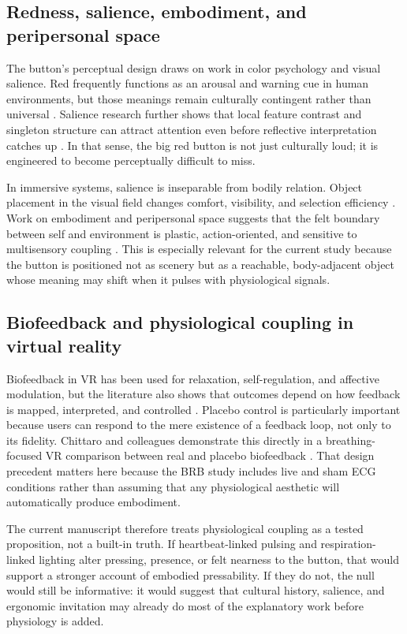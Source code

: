 \subsection{Redness, salience, embodiment, and peripersonal space}

The button's perceptual design draws on work in color psychology and visual salience. Red frequently functions as an arousal and warning cue in human environments, but those meanings remain culturally contingent rather than universal \citep{ElliotMaier2014,GaoEtAl2007}. Salience research further shows that local feature contrast and singleton structure can attract attention even before reflective interpretation catches up \citep{Li2008,CastellottiEtAl2022}. In that sense, the big red button is not just culturally loud; it is engineered to become perceptually difficult to miss.

In immersive systems, salience is inseparable from bodily relation. Object placement in the visual field changes comfort, visibility, and selection efficiency \citep{Lin2021,Mirbagheri2024,Alghofaili2019,McNamara2019}. Work on embodiment and peripersonal space suggests that the felt boundary between self and environment is plastic, action-oriented, and sensitive to multisensory coupling \citep{KilteniEtAl2012,Serino2019,SerinoEtAl2018,BrozzoliEtAl2010}. This is especially relevant for the current study because the button is positioned not as scenery but as a reachable, body-adjacent object whose meaning may shift when it pulses with physiological signals.

\subsection{Biofeedback and physiological coupling in virtual reality}

Biofeedback in VR has been used for relaxation, self-regulation, and affective modulation, but the literature also shows that outcomes depend on how feedback is mapped, interpreted, and controlled \citep{LueddeckeFelnhofer2022,RockstrohEtAl2019}. Placebo control is particularly important because users can respond to the mere existence of a feedback loop, not only to its fidelity. Chittaro and colleagues demonstrate this directly in a breathing-focused VR comparison between real and placebo biofeedback \citep{ChittaroEtAl2024}. That design precedent matters here because the BRB study includes live and sham ECG conditions rather than assuming that any physiological aesthetic will automatically produce embodiment.

The current manuscript therefore treats physiological coupling as a tested proposition, not a built-in truth. If heartbeat-linked pulsing and respiration-linked lighting alter pressing, presence, or felt nearness to the button, that would support a stronger account of embodied pressability. If they do not, the null would still be informative: it would suggest that cultural history, salience, and ergonomic invitation may already do most of the explanatory work before physiology is added.
